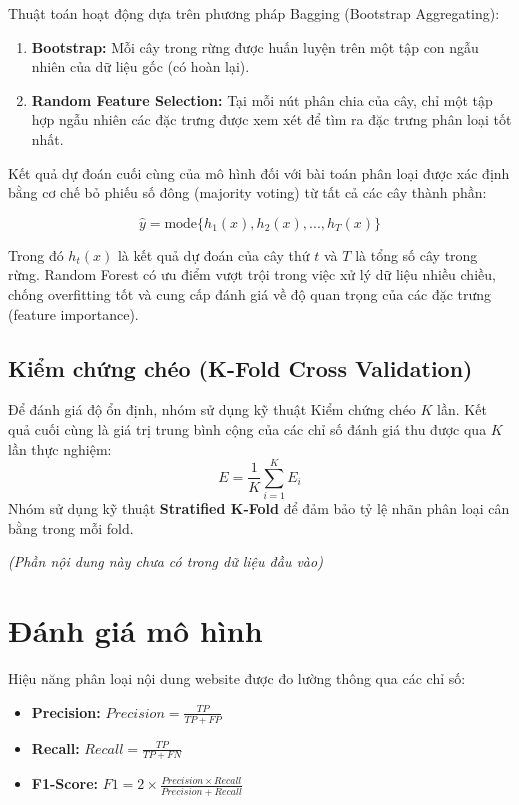 \documentclass[a4paper,12pt]{report}
\begin{document}
Thuật toán hoạt động dựa trên phương pháp Bagging (Bootstrap Aggregating):
\begin{enumerate}
    \item \textbf{Bootstrap:} Mỗi cây trong rừng được huấn luyện trên một tập con ngẫu nhiên của dữ liệu gốc (có hoàn lại).
    \item \textbf{Random Feature Selection:} Tại mỗi nút phân chia của cây, chỉ một tập hợp ngẫu nhiên các đặc trưng được xem xét để tìm ra đặc trưng phân loại tốt nhất.
\end{enumerate}

Kết quả dự đoán cuối cùng của mô hình đối với bài toán phân loại được xác định bằng cơ chế bỏ phiếu số đông (majority voting) từ tất cả các cây thành phần:

\begin{equation}
    \hat{y} = \text{mode} \{h_1(x), h_2(x), ..., h_T(x)\}
\end{equation}

Trong đó $h_t(x)$ là kết quả dự đoán của cây thứ $t$ và $T$ là tổng số cây trong rừng. Random Forest có ưu điểm vượt trội trong việc xử lý dữ liệu nhiều chiều, chống overfitting tốt và cung cấp đánh giá về độ quan trọng của các đặc trưng (feature importance).

\subsection{Kiểm chứng chéo (K-Fold Cross Validation)}
Để đánh giá độ ổn định, nhóm sử dụng kỹ thuật Kiểm chứng chéo $K$ lần. Kết quả cuối cùng là giá trị trung bình cộng của các chỉ số đánh giá thu được qua $K$ lần thực nghiệm:
$$E = \frac{1}{K} \sum_{i=1}^{K} E_i$$
Nhóm sử dụng kỹ thuật \textbf{Stratified K-Fold} để đảm bảo tỷ lệ nhãn phân loại cân bằng trong mỗi fold.

\textit{(Phần nội dung này chưa có trong dữ liệu đầu vào)}

\section{Đánh giá mô hình}
Hiệu năng phân loại nội dung website được đo lường thông qua các chỉ số:
\begin{itemize}
    \item \textbf{Precision:} $Precision = \frac{TP}{TP + FP}$
    \item \textbf{Recall:} $Recall = \frac{TP}{TP + FN}$
    \item \textbf{F1-Score:} $F1 = 2 \times \frac{Precision \times Recall}{Precision + Recall}$
\end{itemize}
\end{document}
